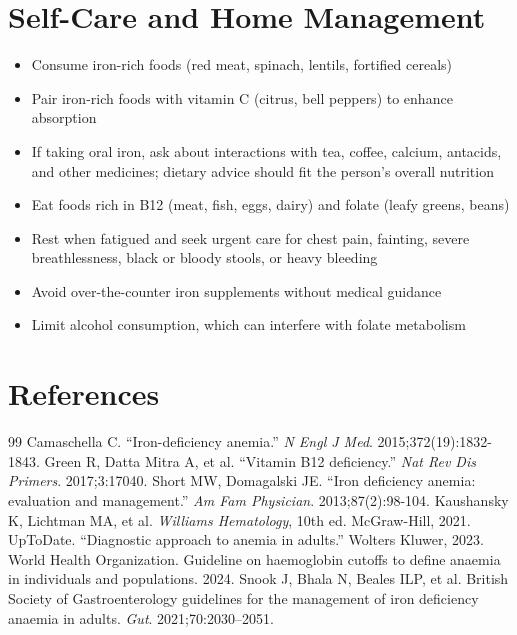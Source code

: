 \section*{Self-Care and Home Management}
\begin{itemize}
\item Consume iron-rich foods (red meat, spinach, lentils, fortified cereals)
\item Pair iron-rich foods with vitamin C (citrus, bell peppers) to enhance absorption
\item If taking oral iron, ask about interactions with tea, coffee, calcium, antacids, and other medicines; dietary advice should fit the person's overall nutrition
\item Eat foods rich in B12 (meat, fish, eggs, dairy) and folate (leafy greens, beans)
\item Rest when fatigued and seek urgent care for chest pain, fainting, severe breathlessness, black or bloody stools, or heavy bleeding
\item Avoid over-the-counter iron supplements without medical guidance
\item Limit alcohol consumption, which can interfere with folate metabolism
\end{itemize}

\section*{References}
\begin{thebibliography}{99}
 Camaschella C. ``Iron-deficiency anemia.'' \textit{N Engl J Med}. 2015;372(19):1832-1843.
 Green R, Datta Mitra A, et al. ``Vitamin B12 deficiency.'' \textit{Nat Rev Dis Primers}. 2017;3:17040.
 Short MW, Domagalski JE. ``Iron deficiency anemia: evaluation and management.'' \textit{Am Fam Physician}. 2013;87(2):98-104.
 Kaushansky K, Lichtman MA, et al. \textit{Williams Hematology}, 10th ed. McGraw-Hill, 2021.
 UpToDate. ``Diagnostic approach to anemia in adults.'' Wolters Kluwer, 2023.
 World Health Organization. Guideline on haemoglobin cutoffs to define anaemia in individuals and populations. 2024.
 Snook J, Bhala N, Beales ILP, et al. British Society of Gastroenterology guidelines for the management of iron deficiency anaemia in adults. \textit{Gut}. 2021;70:2030--2051.
\end{thebibliography}
